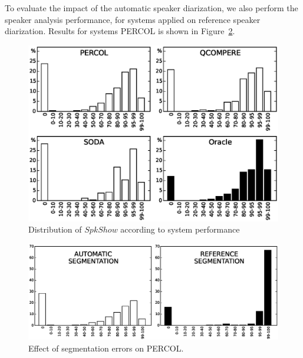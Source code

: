 To evaluate the impact of the automatic speaker diarization, we also perform the speaker analysis performance, for systems applied on reference speaker diarization. Results for systems PERCOL is shown in Figure~\ref{fig:autoVSref}.  


\begin{figure}[t]
\centering
\includegraphics[width=\linewidth]{figures/bimodal.eps}
\caption{Distribution of $SpkShow$ according to system performance}
\label{fig:FMeasureDistribution}
\end{figure}


\begin{figure}[t]
\centering
\includegraphics[width=\linewidth]{figures/ref.eps}
\caption{Effect of segmentation errors on PERCOL.}
\label{fig:autoVSref}
\end{figure}

